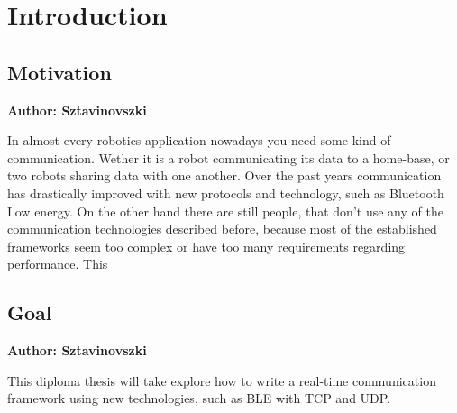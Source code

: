\chapter{Introduction}

\makeatletter
\renewcommand\paragraph{\@startsection{paragraph}{4}{\z@}%
                                     {-3.25ex\@plus -1ex \@minus -.2ex}%
                                     {1.5ex \@plus .2ex}%
                                     {\normalfont\normalsize\bfseries}}
 \setcounter{secnumdepth}{4}
\makeatother

\vspace{2mm}

\section{Motivation}
\textbf{Author: Sztavinovszki}

In almost every robotics application nowadays you need some kind of communication. Wether it is a robot communicating
its data to a home-base, or two robots sharing data with one another. Over the past years communication has drastically
improved with new protocols and technology, such as Bluetooth Low energy. On the other hand there are still people, that
don't use any of the communication technologies described before, because most of the established frameworks seem too
complex or have too many requirements regarding performance. This 

\section{Goal}
\textbf{Author: Sztavinovszki}

This diploma thesis will take explore how to write a real-time communication framework using new technologies, such as BLE with TCP
and UDP.

